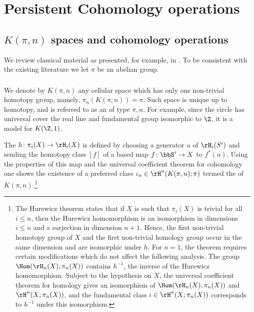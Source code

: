 
\section{Persistent Cohomology operations}\label{s:steenrod}

\subsection{$K(\pi, n)$ spaces and cohomology operations}

We review classical material as presented, for example, in \cite{mosheroperations1968}.
To be consistent with the existing literature we let $\pi$ be an abelian group.

\subsubsection{} We denote by $K(\pi, n)$ any cellular space which has only one non-trivial homotopy group, namely, $\pi_n(K(\pi, n)) = \pi$.
Such space is unique up to homotopy, and is referred to as an  of type $\pi,n$.
For example, since the circle has universal cover the real line and fundamental group isomorphic to $\Z$, it is a model for $K(\Z,1)$.

The  $h \colon \pi_i(X) \rightarrow \rH_i(X)$ is defined by choosing a generator $u$ of $\rH_i(S^i)$ and sending the homotopy class $[f]$ of a based map $f \colon \bbS^i \to X$ to $f^*(u)$.
Using the properties of this map and the universal coefficient theorem for cohomology one shows the existence of a preferred class $\iota_n \in \rH^n(K(\pi, n); \pi)$ termed the  of $K(\pi, n)$.\footnote{The Hurewicz theorem states that if $X$ is such that $\pi_i(X)$ is trivial for all $i \leq n$, then the Hurewicz homomorphism is an isomorphism in dimensions $i \leq n$ and a surjection in dimension $n+1$.
Hence, the first non-trivial homotopy group of $X$ and the first non-trivial homology group occur in the same dimension and are isomorphic under $h$.
For $n=1$, the theorem requires certain modifications which do not affect the following analysis.
The group $\Hom(\rH_n(X), \pi_n(X))$ contains $h^{-1}$, the inverse of the Hurewicz homomorphism.
Subject to the hypothesis on $X$, the universal coefficient theorem for homology gives an isomorphism of $\Hom(\rH_n(X), \pi_n(X))$ and $\rH^n(X; \pi_n(X))$, and the fundamental class $\iota \in \rH^n(X; \pi_n(X))$ corresponds to $h^{-1}$ under this isomorphism.}

